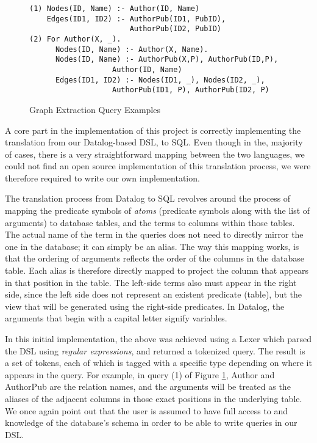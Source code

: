 \documentclass[11pt,letterpaper]{article}
\begin{document}
\begin{figure}[t]
\scriptsize
\begin{lstlisting}[breaklines,basicstyle=\ttfamily]
(1) Nodes(ID, Name) :- Author(ID, Name)
    Edges(ID1, ID2) :- AuthorPub(ID1, PubID),
                       AuthorPub(ID2, PubID)
(2) For Author(X, _).
      Nodes(ID, Name) :- Author(X, Name).
      Nodes(ID, Name) :- AuthorPub(X,P), AuthorPub(ID,P),
                   Author(ID, Name)
      Edges(ID1, ID2) :- Nodes(ID1, _), Nodes(ID2, _),
                   AuthorPub(ID1, P), AuthorPub(ID2, P)
\end{lstlisting}
\vspace{-10pt}
\caption{Graph Extraction Query Examples}
\vspace{-10pt}
\label{fig:queries}
\end{figure}

A core part in the implementation of this project is correctly implementing the translation from our Datalog-based DSL, to SQL. Even though in the, majority of cases, there is a very straightforward mapping between the two languages, we could not find an open source implementation of this translation process, we were therefore required to write our own implementation.

The translation process from Datalog to SQL revolves around the process of mapping the predicate symbols of \textit{atoms} (predicate symbols along with the list of arguments) to database tables, and the terms to columns within those tables. The actual name of the term in the queries does not need to directly mirror the one in the database; it can simply be an alias. The way this mapping works, is that the ordering of arguments reflects the order of the columns in the database table. Each alias is therefore directly mapped to project the column that appears in that position in the table. The left-side terms also must appear in the right side, since the left side does not represent an existent predicate (table), but the view that will be generated using the right-side predicates. In Datalog, the arguments that begin with a capital letter signify variables.

In this initial implementation, the above was achieved using a Lexer which parsed the DSL using \textit{regular expressions}, and returned a tokenized query. The result is a set of tokens, each of which is tagged with a specific type depending on where it appears in the query. For example, in query (1) of Figure \ref{fig:queries}, Author and AuthorPub are the relation names, and the arguments will be treated as the aliases of the adjacent columns in those exact positions in the underlying table. We once again point out that the user is assumed to have full access to and knowledge of the database's schema in order to be able to write queries in our DSL.
\end{document}

